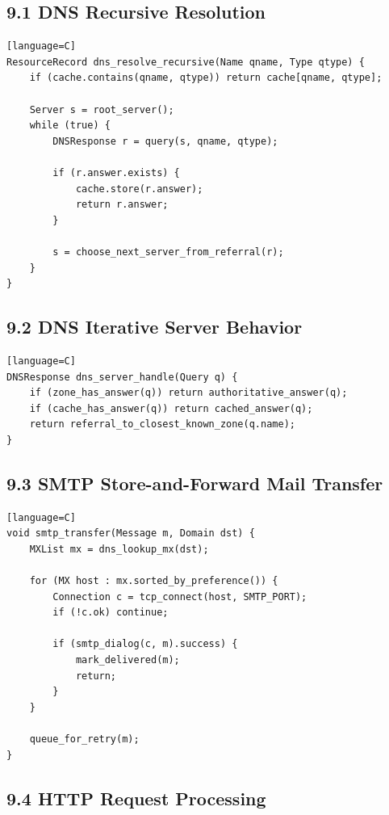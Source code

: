 \documentclass[11pt]{article}
\begin{document}
\subsection{9.1 DNS Recursive
Resolution}\label{dns-recursive-resolution}

\begin{verbatim}[language=C]
ResourceRecord dns_resolve_recursive(Name qname, Type qtype) {
    if (cache.contains(qname, qtype)) return cache[qname, qtype];

    Server s = root_server();
    while (true) {
        DNSResponse r = query(s, qname, qtype);

        if (r.answer.exists) {
            cache.store(r.answer);
            return r.answer;
        }

        s = choose_next_server_from_referral(r);
    }
}
\end{verbatim}

\subsection{9.2 DNS Iterative Server
Behavior}\label{dns-iterative-server-behavior}

\begin{verbatim}[language=C]
DNSResponse dns_server_handle(Query q) {
    if (zone_has_answer(q)) return authoritative_answer(q);
    if (cache_has_answer(q)) return cached_answer(q);
    return referral_to_closest_known_zone(q.name);
}
\end{verbatim}

\subsection{9.3 SMTP Store-and-Forward Mail
Transfer}\label{smtp-store-and-forward-mail-transfer}

\begin{verbatim}[language=C]
void smtp_transfer(Message m, Domain dst) {
    MXList mx = dns_lookup_mx(dst);

    for (MX host : mx.sorted_by_preference()) {
        Connection c = tcp_connect(host, SMTP_PORT);
        if (!c.ok) continue;

        if (smtp_dialog(c, m).success) {
            mark_delivered(m);
            return;
        }
    }

    queue_for_retry(m);
}
\end{verbatim}

\subsection{9.4 HTTP Request Processing}\label{http-request-processing}
\end{document}

